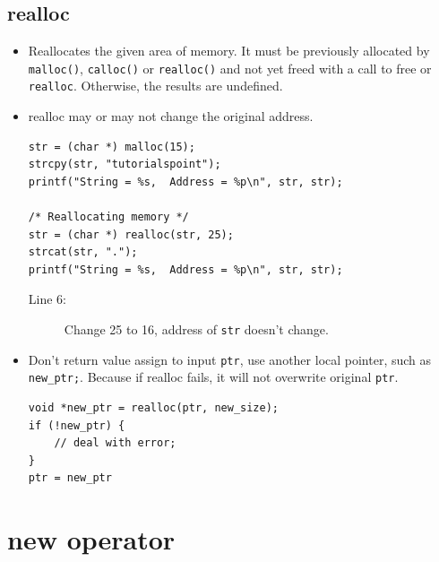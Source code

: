 \documentclass[a4paper,11pt,twoside]{book}
\begin{document}
\subsection{realloc}
\begin{itemize}
	
	\item Reallocates the given area of memory. It must be previously allocated by \texttt{malloc()}, \texttt{calloc()} or \texttt{realloc()} and not yet freed with a call to free or \texttt{realloc}. Otherwise, the results are undefined.
	
	\item realloc may or may not change the original address. 
\begin{lstlisting}[numbers=none]
str = (char *) malloc(15);
strcpy(str, "tutorialspoint");
printf("String = %s,  Address = %p\n", str, str);

/* Reallocating memory */
str = (char *) realloc(str, 25);
strcat(str, ".");
printf("String = %s,  Address = %p\n", str, str);
\end{lstlisting}
\begin{description}
	\item[Line 6:] Change 25 to 16, address of \texttt{str} doesn't change.
\end{description}

	
	
	\item Don't return value assign to input \texttt{ptr}, use another local pointer, such as \texttt{new\_ptr;}. Because if realloc fails, it will not overwrite original \texttt{ptr}.
\begin{lstlisting}[numbers=none]
void *new_ptr = realloc(ptr, new_size);
if (!new_ptr) {
	// deal with error;
}
ptr = new_ptr
\end{lstlisting}
\end{itemize}


\section{new operator}
\end{document}
